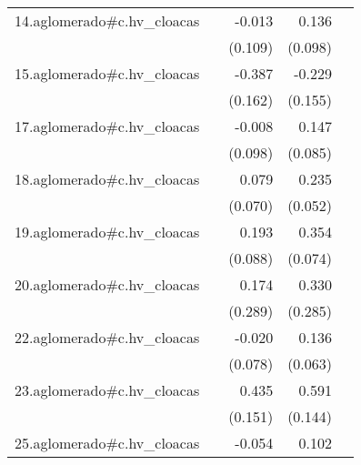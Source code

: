 {\begin{longtable}{l*{4}{D{.}{.}{-1}}}
\addlinespace
14.aglomerado#c.hv\_cloacas&                     &      -0.013         &       0.136         &                     \\
            &                     &     (0.109)         &     (0.098)         &                     \\
\addlinespace
15.aglomerado#c.hv\_cloacas&                     &      -0.387\sym{*}  &      -0.229         &                     \\
            &                     &     (0.162)         &     (0.155)         &                     \\
\addlinespace
17.aglomerado#c.hv\_cloacas&                     &      -0.008         &       0.147         &                     \\
            &                     &     (0.098)         &     (0.085)         &                     \\
\addlinespace
18.aglomerado#c.hv\_cloacas&                     &       0.079         &       0.235\sym{***}&                     \\
            &                     &     (0.070)         &     (0.052)         &                     \\
\addlinespace
19.aglomerado#c.hv\_cloacas&                     &       0.193\sym{*}  &       0.354\sym{***}&                     \\
            &                     &     (0.088)         &     (0.074)         &                     \\
\addlinespace
20.aglomerado#c.hv\_cloacas&                     &       0.174         &       0.330         &                     \\
            &                     &     (0.289)         &     (0.285)         &                     \\
\addlinespace
22.aglomerado#c.hv\_cloacas&                     &      -0.020         &       0.136\sym{*}  &                     \\
            &                     &     (0.078)         &     (0.063)         &                     \\
\addlinespace
23.aglomerado#c.hv\_cloacas&                     &       0.435\sym{**} &       0.591\sym{***}&                     \\
            &                     &     (0.151)         &     (0.144)         &                     \\
\addlinespace
25.aglomerado#c.hv\_cloacas&                     &      -0.054         &       0.102         &                     \\

\end{longtable}}
